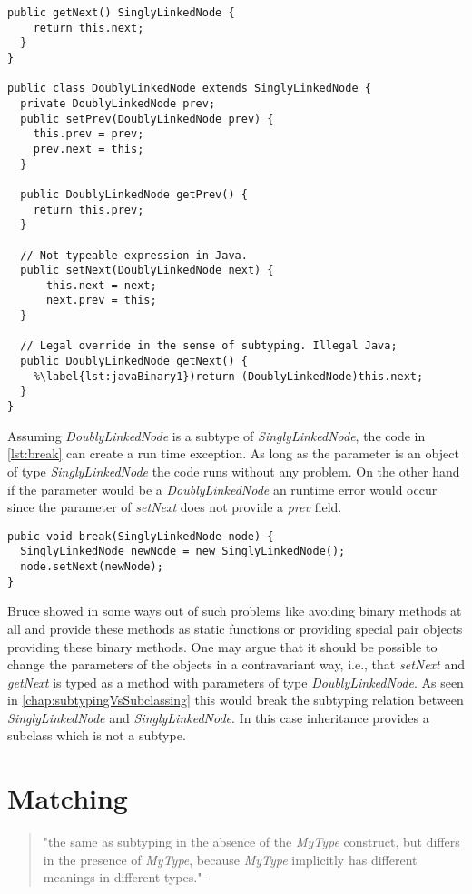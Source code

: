 \begin{lstlisting}[caption={Illegal subtyping of binary methods in Java},label={lst:javaBinary}]
  public getNext() SinglyLinkedNode {
    return this.next;
  }
}

public class DoublyLinkedNode extends SinglyLinkedNode {
  private DoublyLinkedNode prev;
  public setPrev(DoublyLinkedNode prev) {
    this.prev = prev;
    prev.next = this;
  }

  public DoublyLinkedNode getPrev() {
    return this.prev;
  }
  
  // Not typeable expression in Java.
  public setNext(DoublyLinkedNode next) {
      this.next = next;
      next.prev = this;
  }

  // Legal override in the sense of subtyping. Illegal Java;
  public DoublyLinkedNode getNext() {
    %\label{lst:javaBinary1})return (DoublyLinkedNode)this.next;
  }
}
\end{lstlisting}

Assuming \emph{DoublyLinkedNode} is a subtype of \emph{SinglyLinkedNode},
the code in \autoref{lst:break} can create a run time exception. As long
as the parameter is an object of type \emph{SinglyLinkedNode} the code
runs without any problem. On the other hand if the parameter would be a
\emph{DoublyLinkedNode} an runtime error would occur since the parameter
of \emph{setNext} does not provide a \emph{prev} field.

\begin{lstlisting}[label={lst:break},caption={Breaking a doubly linked node}]
pubic void break(SinglyLinkedNode node) {
  SinglyLinkedNode newNode = new SinglyLinkedNode();
  node.setNext(newNode);
}
\end{lstlisting}

Bruce showed in \cite{bruce_binary_1995} some ways out of such problems
like avoiding binary methods at all and provide these methods as static
functions or providing special pair objects providing these binary
methods. One may argue that it should be possible to change the parameters
of the objects in a contravariant way, i.e., that \emph{setNext}
and \emph{getNext} is typed as a method with parameters of type
\emph{DoublyLinkedNode}. As seen in \autoref{chap:subtypingVsSubclassing}
this would break the subtyping relation between \emph{SinglyLinkedNode}
and \emph{SinglyLinkedNode}. In this case inheritance provides a subclass
which is not a subtype.

\section{Matching}
\begin{quotation}
"the same as subtyping in the absence of the \emph{MyType}
construct, but differs in the presence of \emph{MyType}, because
\emph{MyType} implicitly has different meanings in different types." -
\cite{bruce_foundations_2002}
\end{quotation}

